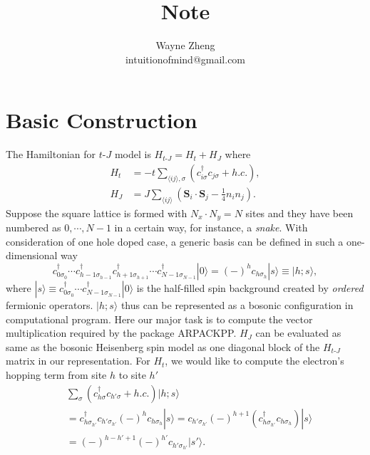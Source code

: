 \documentclass[eprint]{article} %
\begin{document}
\title{Note}
\author{Wayne Zheng \\ intuitionofmind@gmail.com}


\maketitle
\section{Basic Construction}
The Hamiltonian for $t$-$J$ model is $H_{t\text{-}J}=H_{t}+H_{J}$ where
\begin{equation}\label{tj}
\begin{split}
H_{t} &= -t\sum_{\langle{ij}\rangle, \sigma}(c_{i\sigma}^{\dagger}c_{j\sigma}+h.c.), \\
H_{J} &= J\sum_{\langle{ij}\rangle}\left(\mathbf{S}_{i}\cdot\mathbf{S}_{j}-\frac{1}{4}n_{i}n_{j}\right).
\end{split}  
\end{equation}
Suppose the square lattice is formed with $N_{x}\cdot{N}_{y}=N$ sites and they have been numbered as $0, \cdots, N-1$ in a certain way, for instance, a \emph{snake}. With consideration of one hole doped case, a generic basis can be defined in such a one-dimensional way
\begin{equation}
    c_{0\sigma_{0}}^{\dagger}\cdots{c}_{h-1\sigma_{h-1}}^{\dagger}c_{h+1\sigma_{h+1}}^{\dagger}\cdots{c}_{N-1\sigma_{N-1}}^{\dagger}|0\rangle=(-)^{h}c_{h\sigma_{h}}|s\rangle\equiv|h; s\rangle,
    \label{}
\end{equation}
where $|s\rangle\equiv{c}_{0\sigma_{0}}^{\dagger}\cdots{c}_{N-1\sigma_{N-1}}^{\dagger}|0\rangle$ is the half-filled spin background created by \emph{ordered} fermionic operators. $|h; s\rangle$ thus can be represented as a bosonic configuration in computational program. Here our major task is to compute the vector multiplication required by the package ARPACKPP\cite{arpackpp}. $H_{J}$ can be evaluated as same as the bosonic Heisenberg spin model as one diagonal block of the $H_{t\text{-}J}$ matrix in our representation. For $H_{t}$, we would like to compute the electron's hopping term from site $h$ to site $h{'}$
\begin{equation}
    \begin{aligned}
    &\sum_{\sigma}(c_{h\sigma}^{\dagger}c_{h{'\sigma}}+h.c.)|h; s\rangle \\
    &=c_{h\sigma_{h{'}}}^{\dagger}c_{h{'}\sigma_{h{'}}}(-)^{h}c_{h\sigma_{h}}|s\rangle=c_{h{'}\sigma_{h{'}}}(-)^{h+1}(c_{h\sigma_{h{'}}}^{\dagger}c_{h\sigma_{h}})|s\rangle \\
    &=(-)^{h-h{'}+1}(-)^{h{'}}c_{h{'}\sigma_{h{'}}}|s{'}\rangle.
    \end{aligned}
    \label{}
\end{equation}
\end{document}
